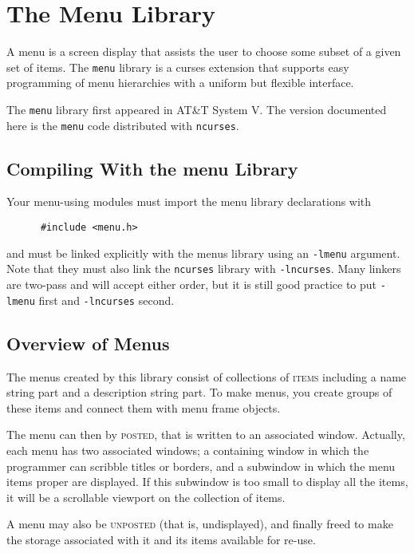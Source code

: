 \chapter{The Menu Library}

\label{f0:menu}A menu is a screen display that assists the user to choose some subset
of a given set of items.  The \texttt{menu} library is a curses
extension that supports easy programming of menu hierarchies with a
uniform but flexible interface. 

The \texttt{menu} library first appeared in AT\&T System V.  The
version documented here is the \texttt{menu} code distributed
with \texttt{ncurses}.

\section{Compiling With the menu Library}

\label{f0:mcompile}Your menu-using modules must import the menu library declarations with
\begin{verbatim} 	  #include <menu.h>
\end{verbatim}
and must be linked explicitly with the menus library using an
\texttt{-lmenu} argument.  Note that they must also link the
\texttt{ncurses} library with \texttt{-lncurses}.  Many linkers
are two-pass and will accept either order, but it is still good practice
to put \texttt{-lmenu} first and \texttt{-lncurses} second.

\section{Overview of Menus}

\label{f0:moverview}The menus created by this library consist of collections of
\textsc{items} including a name string part and a description string
part.  To make menus, you create groups of these items and connect
them with menu frame objects. 

The menu can then by \textsc{posted}, that is written to an
associated window.  Actually, each menu has two associated windows; a
containing window in which the programmer can scribble titles or
borders, and a subwindow in which the menu items proper are displayed.
If this subwindow is too small to display all the items, it will be a
scrollable viewport on the collection of items. 

A menu may also be \textsc{unposted} (that is, undisplayed), and finally
freed to make the storage associated with it and its items available for
re-use. 

